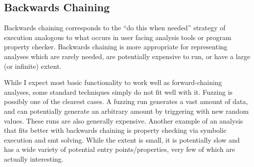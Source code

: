 \subsection{Backwards Chaining}
Backwards chaining corresponds to the ``do this when needed'' strategy of execution analogous to what occurs in user facing analysis tools or program property checker.
Backwards chaining is more appropriate for representing analyses which
are rarely needed,
are potentially expensive to run,
or have a large (or infinite) extent.

While I expect most basic functionality to work well as forward-chaining analyses, some standard techniques simply do not fit well with it.
Fuzzing is possibly one of the clearest cases.
A fuzzing run generates a vast amount of data, and can potentially generate an arbitrary amount by triggering with new random values.
These runs are also generally expensive.
Another example of an analysis that fits better with backwards chaining is property checking via symbolic execution and smt solving.
While the extent is small, it is potentially slow and has a wide variety of potential entry points/properties, very few of which are actually interesting.
